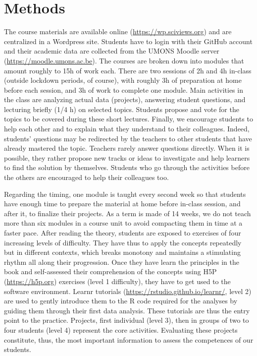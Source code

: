 \documentclass{aims}
\theoremstyle{definition}
\begin{document}
\hypertarget{methods}{%
\section{Methods}\label{methods}}

The course materials are available online
(\url{https://wp.sciviews.org}) and are centralized in a Wordpress site.
Students have to login with their GitHub account and their academic data
are collected from the UMONS Moodle server
(\url{https://moodle.umons.ac.be}). The courses are broken down into
modules that amount roughly to 15h of work each. There are two sessions
of 2h and 4h in-class (outside lockdown periods, of course), with
roughly 3h of preparation at home before each session, and 3h of work to
complete one module. Main activities in the class are analyzing actual
data (projects), answering student questions, and lecturing briefly (1/4
h) on selected topics. Students propose and vote for the topics to be
covered during these short lectures. Finally, we encourage students to
help each other and to explain what they understand to their colleagues.
Indeed, students' questions may be redirected by the teachers to other
students that have already mastered the topic. Teachers rarely answer
questions directly. When it is possible, they rather propose new tracks
or ideas to investigate and help learners to find the solution by
themselves. Students who go through the activities before the others are
encouraged to help their colleagues too.

Regarding the timing, one module is taught every second week so that
students have enough time to prepare the material at home before
in-class session, and after it, to finalize their projects. As a term is
made of 14 weeks, we do not teach more than six modules in a course unit
to avoid compacting them in time at a faster pace. After reading the
theory, students are exposed to exercises of four increasing levels of
difficulty. They have thus to apply the concepts repeatedly but in
different contexts, which breaks monotony and maintains a stimulating
rhythm all along their progression. Once they have learn the principles
in the book and self-assessed their comprehension of the concepts using
H5P (\url{https://h5p.org}) exercises (level 1 difficulty), they have to
get used to the software environment. Learnr tutorials
(\url{https://rstudio.github.io/learnr/}, level 2) are used to gently
introduce them to the R code required for the analyses by guiding them
through their first data analysis. These tutorials are thus the entry
point to the practice. Projects, first individual (level 3), then in
groups of two to four students (level 4) represent the core activities.
Evaluating these projects constitute, thus, the most important
information to assess the competences of our students.
\end{document}
